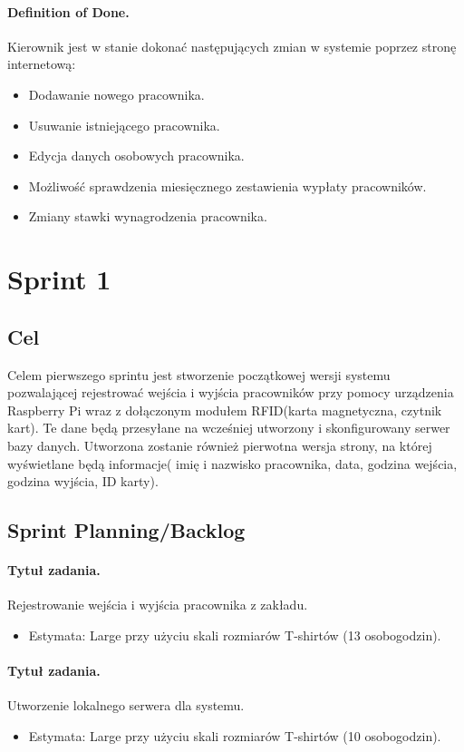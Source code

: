 \documentclass[a4paper]{article}
\begin{document}
\paragraph{Definition of Done.} Kierownik jest w stanie dokonać następujących zmian w systemie poprzez stronę internetową:
\begin{itemize}
\item Dodawanie nowego pracownika.
\item Usuwanie istniejącego pracownika.
\item Edycja danych osobowych pracownika.
\item Możliwość sprawdzenia miesięcznego zestawienia wypłaty pracowników.
\item Zmiany stawki wynagrodzenia pracownika.
\end {itemize}

\section{Sprint 1}
\subsection{Cel} Celem pierwszego sprintu jest stworzenie początkowej wersji systemu pozwalającej rejestrować wejścia i wyjścia pracowników przy pomocy urządzenia Raspberry Pi wraz z dołączonym modułem RFID(karta magnetyczna, czytnik kart). Te dane będą przesyłane na wcześniej utworzony i skonfigurowany serwer bazy danych. Utworzona zostanie również pierwotna wersja strony, na której wyświetlane będą informacje( imię i nazwisko pracownika, data, godzina wejścia, godzina wyjścia, ID karty).
\subsection{Sprint Planning/Backlog}

\paragraph{Tytuł zadania.} Rejestrowanie wejścia i wyjścia pracownika z zakładu.
\begin{itemize}
\item Estymata: Large przy użyciu skali rozmiarów T-shirtów (13 osobogodzin).
\end{itemize}

\paragraph{Tytuł zadania.} Utworzenie lokalnego serwera dla systemu.
\begin{itemize}
\item Estymata: Large przy użyciu skali rozmiarów T-shirtów (10 osobogodzin).
\end{itemize}
\end{document}
